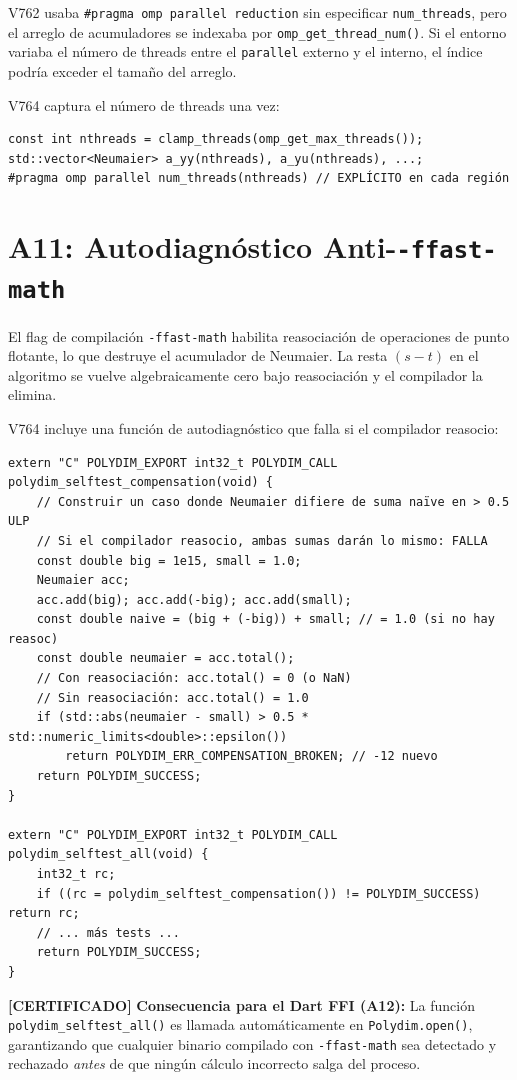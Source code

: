 V762 usaba \texttt{\#pragma omp parallel reduction} sin especificar \texttt{num\_threads},
pero el arreglo de acumuladores se indexaba por \texttt{omp\_get\_thread\_num()}. Si el entorno
variaba el número de threads entre el \texttt{parallel} externo y el interno, el índice podría
exceder el tamaño del arreglo.

V764 captura el número de threads una vez:
\begin{verbatim}
const int nthreads = clamp_threads(omp_get_max_threads());
std::vector<Neumaier> a_yy(nthreads), a_yu(nthreads), ...;
#pragma omp parallel num_threads(nthreads) // EXPLÍCITO en cada región
\end{verbatim}

\section{A11: Autodiagnóstico Anti-\texttt{-ffast-math}}

El flag de compilación \texttt{-ffast-math} habilita reasociación de operaciones de punto
flotante, lo que destruye el acumulador de Neumaier. La resta $(s - t)$ en el algoritmo
se vuelve algebraicamente cero bajo reasociación y el compilador la elimina.

V764 incluye una función de autodiagnóstico que falla si el compilador reasocio:

\begin{verbatim}
extern "C" POLYDIM_EXPORT int32_t POLYDIM_CALL polydim_selftest_compensation(void) {
    // Construir un caso donde Neumaier difiere de suma naïve en > 0.5 ULP
    // Si el compilador reasocio, ambas sumas darán lo mismo: FALLA
    const double big = 1e15, small = 1.0;
    Neumaier acc;
    acc.add(big); acc.add(-big); acc.add(small);
    const double naive = (big + (-big)) + small; // = 1.0 (si no hay reasoc)
    const double neumaier = acc.total();
    // Con reasociación: acc.total() = 0 (o NaN)
    // Sin reasociación: acc.total() = 1.0
    if (std::abs(neumaier - small) > 0.5 * std::numeric_limits<double>::epsilon())
        return POLYDIM_ERR_COMPENSATION_BROKEN; // -12 nuevo
    return POLYDIM_SUCCESS;
}

extern "C" POLYDIM_EXPORT int32_t POLYDIM_CALL polydim_selftest_all(void) {
    int32_t rc;
    if ((rc = polydim_selftest_compensation()) != POLYDIM_SUCCESS) return rc;
    // ... más tests ...
    return POLYDIM_SUCCESS;
}
\end{verbatim}

\textbf{[CERTIFICADO]} 
\textbf{Consecuencia para el Dart FFI (A12):} La función \texttt{polydim\_selftest\_all()}
es llamada automáticamente en \texttt{Polydim.open()}, garantizando que cualquier
binario compilado con \texttt{-ffast-math} sea detectado y rechazado \textit{antes}
de que ningún cálculo incorrecto salga del proceso.


